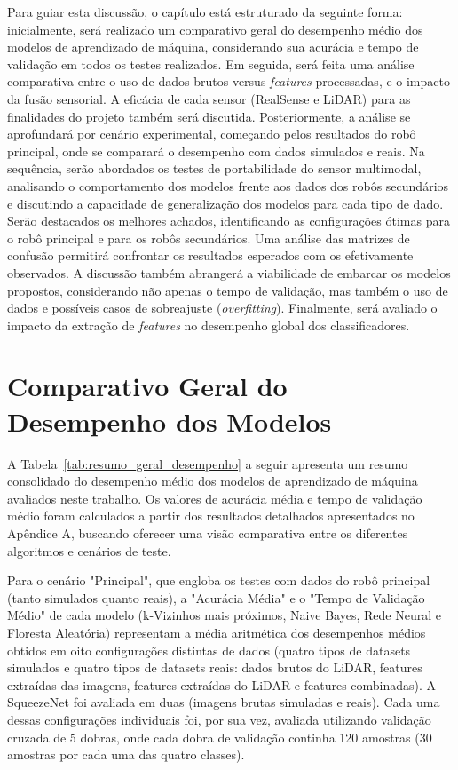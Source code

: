 Para guiar esta discussão, o capítulo está estruturado da seguinte forma: inicialmente, será realizado um comparativo geral do desempenho médio dos modelos de aprendizado de máquina, considerando sua acurácia e tempo de validação em todos os testes realizados. Em seguida, será feita uma análise comparativa entre o uso de dados brutos versus \textit{features} processadas, e o impacto da fusão sensorial. A eficácia de cada sensor (RealSense e LiDAR) para as finalidades do projeto também será discutida. Posteriormente, a análise se aprofundará por cenário experimental, começando pelos resultados do robô principal, onde se comparará o desempenho com dados simulados e reais. Na sequência, serão abordados os testes de portabilidade do sensor multimodal, analisando o comportamento dos modelos frente aos dados dos robôs secundários e discutindo a capacidade de generalização dos modelos para cada tipo de dado. Serão destacados os melhores achados, identificando as configurações ótimas para o robô principal e para os robôs secundários. Uma análise das matrizes de confusão permitirá confrontar os resultados esperados com os efetivamente observados. A discussão também abrangerá a viabilidade de embarcar os modelos propostos, considerando não apenas o tempo de validação, mas também o uso de dados e possíveis casos de sobreajuste (\textit{overfitting}). Finalmente, será avaliado o impacto da extração de \textit{features} no desempenho global dos classificadores.

\section{Comparativo Geral do Desempenho dos Modelos}

A Tabela~\ref{tab:resumo_geral_desempenho} a seguir apresenta um resumo consolidado do desempenho médio dos modelos de aprendizado de máquina avaliados neste trabalho. Os valores de acurácia média e tempo de validação médio foram calculados a partir dos resultados detalhados apresentados no Apêndice A, buscando oferecer uma visão comparativa entre os diferentes algoritmos e cenários de teste.

Para o cenário "Principal", que engloba os testes com dados do robô principal (tanto simulados quanto reais), a "Acurácia Média" e o "Tempo de Validação Médio" de cada modelo (k-Vizinhos mais próximos, Naive Bayes, Rede Neural e Floresta Aleatória) representam a média aritmética dos desempenhos médios obtidos em oito configurações distintas de dados (quatro tipos de datasets simulados e quatro tipos de datasets reais: dados brutos do LiDAR, features extraídas das imagens, features extraídas do LiDAR e features combinadas). A SqueezeNet foi avaliada em duas (imagens brutas simuladas e reais). Cada uma dessas configurações individuais foi, por sua vez, avaliada utilizando validação cruzada de 5 dobras, onde cada dobra de validação continha 120 amostras (30 amostras por cada uma das quatro classes).

